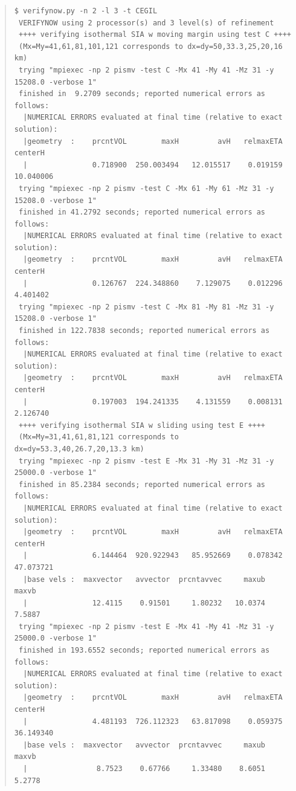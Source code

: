 \documentclass[11pt,final]{amsart}
\begin{document}
\scriptsize\begin{quote}\begin{verbatim}
$ verifynow.py -n 2 -l 3 -t CEGIL
 VERIFYNOW using 2 processor(s) and 3 level(s) of refinement
 ++++ verifying isothermal SIA w moving margin using test C ++++
 (Mx=My=41,61,81,101,121 corresponds to dx=dy=50,33.3,25,20,16 km)
 trying "mpiexec -np 2 pismv -test C -Mx 41 -My 41 -Mz 31 -y 15208.0 -verbose 1"
 finished in  9.2709 seconds; reported numerical errors as follows:
  |NUMERICAL ERRORS evaluated at final time (relative to exact solution):
  |geometry  :    prcntVOL        maxH         avH   relmaxETA      centerH
  |               0.718900  250.003494   12.015517    0.019159    10.040006
 trying "mpiexec -np 2 pismv -test C -Mx 61 -My 61 -Mz 31 -y 15208.0 -verbose 1"
 finished in 41.2792 seconds; reported numerical errors as follows:
  |NUMERICAL ERRORS evaluated at final time (relative to exact solution):
  |geometry  :    prcntVOL        maxH         avH   relmaxETA      centerH
  |               0.126767  224.348860    7.129075    0.012296     4.401402
 trying "mpiexec -np 2 pismv -test C -Mx 81 -My 81 -Mz 31 -y 15208.0 -verbose 1"
 finished in 122.7838 seconds; reported numerical errors as follows:
  |NUMERICAL ERRORS evaluated at final time (relative to exact solution):
  |geometry  :    prcntVOL        maxH         avH   relmaxETA      centerH
  |               0.197003  194.241335    4.131559    0.008131     2.126740
 ++++ verifying isothermal SIA w sliding using test E ++++
 (Mx=My=31,41,61,81,121 corresponds to dx=dy=53.3,40,26.7,20,13.3 km)
 trying "mpiexec -np 2 pismv -test E -Mx 31 -My 31 -Mz 31 -y 25000.0 -verbose 1"
 finished in 85.2384 seconds; reported numerical errors as follows:
  |NUMERICAL ERRORS evaluated at final time (relative to exact solution):
  |geometry  :    prcntVOL        maxH         avH   relmaxETA      centerH
  |               6.144464  920.922943   85.952669    0.078342    47.073721
  |base vels :  maxvector   avvector  prcntavvec     maxub     maxvb
  |               12.4115    0.91501     1.80232   10.0374    7.5887
 trying "mpiexec -np 2 pismv -test E -Mx 41 -My 41 -Mz 31 -y 25000.0 -verbose 1"
 finished in 193.6552 seconds; reported numerical errors as follows:
  |NUMERICAL ERRORS evaluated at final time (relative to exact solution):
  |geometry  :    prcntVOL        maxH         avH   relmaxETA      centerH
  |               4.481193  726.112323   63.817098    0.059375    36.149340
  |base vels :  maxvector   avvector  prcntavvec     maxub     maxvb
  |                8.7523    0.67766     1.33480    8.6051    5.2778

\end{verbatim}
\end{quote}
\end{document}
